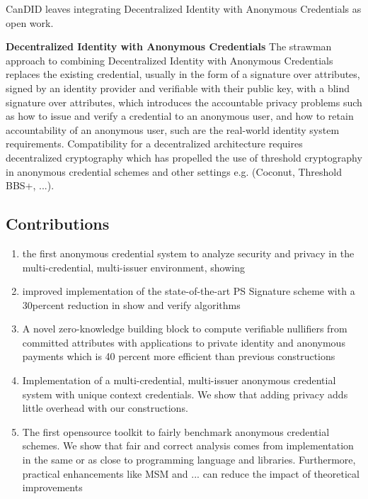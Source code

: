CanDID leaves integrating Decentralized Identity with Anonymous Credentials as open work.

\noindent \textbf{Decentralized Identity with Anonymous Credentials}
The strawman approach to combining Decentralized Identity with Anonymous Credentials replaces the existing credential, usually in the form of a signature over attributes, signed by an identity provider and verifiable with their public key, with a blind signature over attributes, which introduces the accountable privacy problems such as how to issue and verify a credential to an anonymous user, and how to retain accountability of an anonymous user, such are the real-world identity system requirements. 
Compatibility for a decentralized architecture requires decentralized cryptography which has propelled the use of threshold cryptography in anonymous credential schemes and other settings e.g. (Coconut, Threshold BBS+, ...). 


\newpage

\subsection{Contributions}

\begin{enumerate}

    \item the first anonymous credential system to analyze security and privacy in the multi-credential, multi-issuer environment, showing 

    \item improved implementation of the state-of-the-art PS Signature scheme with a 30percent reduction in show and verify algorithms

    \item A novel zero-knowledge building block to compute verifiable nullifiers from committed attributes with applications to private identity and anonymous payments which is 40 percent more efficient than previous constructions

    \item Implementation of a multi-credential, multi-issuer anonymous credential system with unique context credentials. We show that adding privacy adds little overhead with our constructions.

    \item The first opensource toolkit to fairly benchmark anonymous credential schemes. We show that fair and correct analysis comes from implementation in the same or as close to programming language and libraries. Furthermore, practical enhancements like MSM and ... can reduce the impact of theoretical improvements
    
\end{enumerate}

